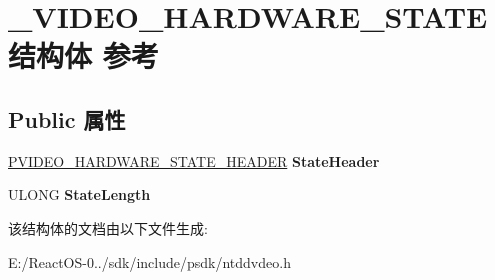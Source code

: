 \hypertarget{struct___v_i_d_e_o___h_a_r_d_w_a_r_e___s_t_a_t_e}{}\section{\+\_\+\+V\+I\+D\+E\+O\+\_\+\+H\+A\+R\+D\+W\+A\+R\+E\+\_\+\+S\+T\+A\+T\+E结构体 参考}
\label{struct___v_i_d_e_o___h_a_r_d_w_a_r_e___s_t_a_t_e}
\subsection*{Public 属性}
\begin{DoxyCompactItemize}
\item 
\mbox{\label{struct___v_i_d_e_o___h_a_r_d_w_a_r_e___s_t_a_t_e_a105d4ba294d58705624390c52fb9db56}} 
\hyperlink{struct___v_i_d_e_o___h_a_r_d_w_a_r_e___s_t_a_t_e___h_e_a_d_e_r}{P\+V\+I\+D\+E\+O\+\_\+\+H\+A\+R\+D\+W\+A\+R\+E\+\_\+\+S\+T\+A\+T\+E\+\_\+\+H\+E\+A\+D\+ER} {\bfseries State\+Header}
\item 
\mbox{\label{struct___v_i_d_e_o___h_a_r_d_w_a_r_e___s_t_a_t_e_ac34f44dae5f8039b2cab9a15fdfd180c}} 
U\+L\+O\+NG {\bfseries State\+Length}
\end{DoxyCompactItemize}


该结构体的文档由以下文件生成\+:\begin{DoxyCompactItemize}
\item 
E\+:/\+React\+O\+S-\/0../sdk/include/psdk/ntddvdeo.\+h\end{DoxyCompactItemize}
